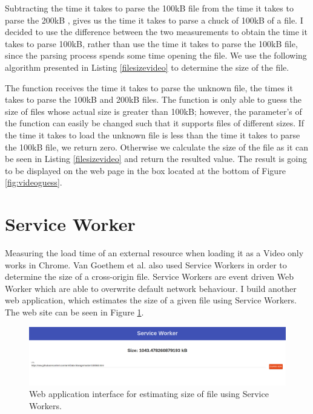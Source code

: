 \documentclass[10pt,a4paper,twoside]{book}
\begin{document}
Subtracting the time it takes to parse the 100kB file  from the time it takes to parse the 200kB , gives us the time it takes to parse a chuck of 100kB of a file. I decided to use the difference between the two measurements to obtain the time it takes to parse 100kB, rather than use the time it takes to parse the 100kB file, since the parsing process spends some time opening the file. We use the following algorithm presented in Listing \ref{filesizevideo} to determine the size of the file.

The function receives the time it takes to parse the unknown file, the times it takes to parse the 100kB and 200kB files. The function is only able to guess the size of files whose actual size is greater than 100kB; however, the parameter's of the function can easily be changed such that it supports files of different sizes. If the time it takes to load the unknown file is less than the time it takes to parse the 100kB file, we return zero. Otherwise we calculate the size of the file as it can be seen in Listing \ref{filesizevideo} and return the resulted value. The result is going to be displayed on the web page in the box located at the bottom of Figure \ref{fig:videoguess}.

\section{Service Worker}

Measuring the load time of an external resource when loading it as a Video only works in Chrome. Van Goethem et al. \cite{van2015clock} also used Service Workers in order to determine the size of a cross-origin file. Service Workers are event driven Web Worker which are able to overwrite default network behaviour. I build another web application, which estimates the size of a given file using Service Workers. The web site can be seen in Figure \ref{fig:swguess}.

\begin{figure}[h]
\centering
\includegraphics[width=\textwidth]{figures/sw_size.png}
\caption{Web application interface for estimating size of file using Service Workers.}
\label{fig:swguess}
\end{figure}
\end{document}
